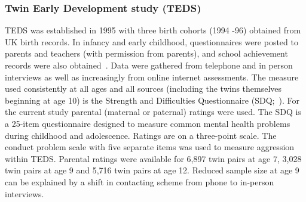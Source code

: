 \subsubsection{Twin Early Development study (TEDS)}
TEDS was established in 1995 with three birth cohorts (1994 -96) obtained from UK birth records.
In infancy and early childhood, questionnaires were posted to parents and teachers (with permission from parents), and school achievement records were also obtained~\cite{Haworth2012}.
Data were gathered from telephone and in person interviews as well as increasingly from online internet assessments.
The measure used consistently at all ages and all sources (including the twins themselves beginning at age 10) is the Strength and Difficulties Questionnaire (SDQ;~\cite{Goodman1997, Goodman2001}).
For the current study parental (maternal or paternal) ratings were used.
The SDQ is a 25-item questionnaire designed to measure common mental health problems during childhood and adolescence.
Ratings are on a three-point scale.
The conduct problem scale with five separate items was used to measure aggression within TEDS\@.
Parental ratings were available for 6,897 twin pairs at age 7, 3,028 twin pairs at age 9 and 5,716 twin pairs at age 12.
Reduced sample size at age 9 can be explained by a shift in contacting scheme from phone to in-person interviews.

